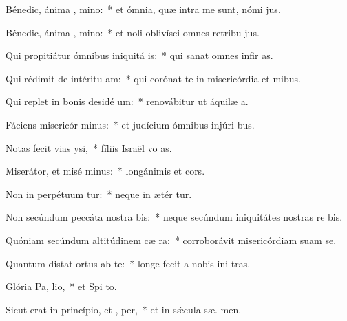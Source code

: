 \item Bénedic, ánima , mino:~* et ómnia, quæ intra me sunt, nómi  jus.
\item Bénedic, ánima , mino:~* et noli oblivísci omnes retribu jus.
\item Qui propitiátur ómnibus iniquitá is:~* qui sanat omnes infir as.
\item Qui rédimit de intéritu  am:~* qui corónat te in misericórdia et mibus.
\item Qui replet in bonis desidé um:~* renovábitur ut áquilæ  a.
\item Fáciens misericór minus:~* et judícium ómnibus injúri bus.
\item Notas fecit vias  ysi,~* fíliis Israël vo as.
\item Miserátor, et misé minus:~* longánimis et  cors.
\item Non in perpétuum tur:~* neque in ætér tur.
\item Non secúndum peccáta nostra  bis:~* neque secúndum iniquitátes nostras re bis.
\item Quóniam secúndum altitúdinem cæ  ra:~* corroborávit misericórdiam suam   se.
\item Quantum distat ortus ab te:~* longe fecit a nobis ini tras.
\item Glória Pa,  lio,~* et Spi to.
\item Sicut erat in princípio, et ,  per,~* et in sǽcula sæ. men.
